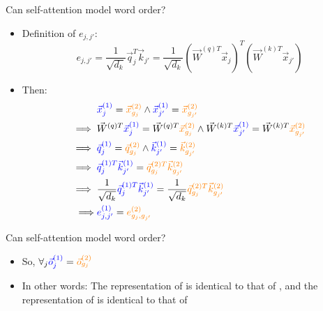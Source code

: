 \begin{vbframe}{Can self-attention model word order?}

\vfill

\begin{itemize}
\item Definition of $e_{j,j'}$:
$$e_{j,j'} = \frac{1}{\sqrt{d_k}} \vec q_{j}^T \vec k_{j'} = \frac{1}{\sqrt{d_k}} (\vec W^{(q)T} \vec x_{j})^T (\vec W^{(k)T} \vec x_{j'})$$
\item Then:
$$
\begin{aligned}
& \textcolor{blue}{\vec x^{(1)}_j} = \textcolor{orange}{\vec x^{(2)}_{g_j}} \land \textcolor{blue}{\vec x^{(1)}_{j'}} = \textcolor{orange}{\vec x^{(2)}_{g_{j'}}} \\
\implies{} & \vec W^{(q)T} \textcolor{blue}{\vec x^{(1)}_j} = \vec W^{(q)T} \textcolor{orange}{\vec x^{(2)}_{g_j}} \land \vec W^{(k)T} \textcolor{blue}{\vec x^{(1)}_{j'}} = \vec W^{(k)T} \textcolor{orange}{\vec x^{(2)}_{g_{j'}}} \\
\implies{} & \textcolor{blue}{\vec q^{(1)}_j} = \textcolor{orange}{\vec q^{(2)}_{g_j}} \land \textcolor{blue}{\vec k^{(1)}_{j'}} = \textcolor{orange}{\vec k^{(2)}_{g_{j'}}} \\
\implies{} & \textcolor{blue}{\vec q^{(1)T}_j \vec k^{(1)}_{j'}} = \textcolor{orange}{\vec q^{(2)T}_{g_j} \vec k^{(2)}_{g_{j'}}} \\
\implies{} & \frac{1}{\sqrt{d_k}} \textcolor{blue}{\vec q^{(1)T}_j \vec k^{(1)}_{j'}} =  \frac{1}{\sqrt{d_k}}  \textcolor{orange}{\vec q^{(2)T}_{g_j} \vec k^{(2)}_{g_{j'}}} \\
\implies & \textcolor{blue}{e^{(1)}_{j,j'}} = \textcolor{orange}{e^{(2)}_{g_j, g_{j'}}}
\end{aligned}
$$
\end{itemize}

\vfill

\end{vbframe}


\begin{vbframe}{Can self-attention model word order?}

\vfill

\begin{itemize}
\item So, $\forall_j \textcolor{blue}{\vec o^{(1)}_j} = \textcolor{orange}{\vec o^{(2)}_{g_j}}$
\item In other words: The representation of  is identical to that of , and the representation of  is identical to that of 
\end{itemize}

\vfill

\end{vbframe}

